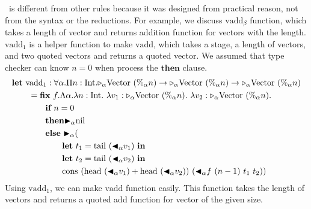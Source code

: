 \QPercent\ is different from other rules because it was designed from practical reason, not from the syntax or the reductions.
For example, we discuss $\text{vadd}_\beta$ function,
which takes a length of vector and returns addition function for vectors with the length.
$\text{vadd}_1$ is a helper function to make $\text{vadd}$, 
which takes a stage, a length of vectors, and two quoted vectors and returns a quoted vector.
We assumed that type checker can know $n=0$ when process the $\textbf{then}$ clause.
\newcommand{\Vpn}{\text{Vector}\ (\%_\alpha n)}
\begin{align*}
	  & \textbf{let}\ \text{vadd}_1 : \F\alpha.\Pi n:\I.\TW_\alpha\Vpn\to\TW_\alpha\Vpn\to\TW_\alpha\Vpn                                \\
	  & \hspace{7mm} = \textbf{fix}\ f.\Lambda\alpha.\lambda n:\I.\ \lambda v_1:\TW_\alpha\Vpn.\ \lambda v_2:\TW_\alpha\Vpn.            \\
	  & \hspace{14mm} \textbf{if}\ n = 0                                                                                                \\
	  & \hspace{14mm} \textbf{then} \TB_\alpha \text{nil}                                                                               \\
	  & \hspace{14mm} \textbf{else}\ \TB_\alpha (                                                                                       \\
	  & \hspace{21mm} \textbf{let}\ t_1 = \text{tail}\ (\TBL_\alpha v_1)\ \textbf{in}                                                   \\
	  & \hspace{21mm} \textbf{let}\ t_2 = \text{tail}\ (\TBL_\alpha v_2)\ \textbf{in}                                                   \\
	  & \hspace{21mm} \text{cons}\ (\text{head}\ (\TBL_\alpha v_1) + \text{head}\ (\TBL_\alpha v_2))\ (\TBL_\alpha f\ (n-1)\ t_1\ t_2)) \\
\end{align*}
Using $\text{vadd}_1$, we can make $\text{vadd}$ function easily.
This function takes the length of vectors and returns a quoted add function for vector of the given size.
\renewcommand{\Vpn}{\text{Vector}\ (\%_\beta n)}
